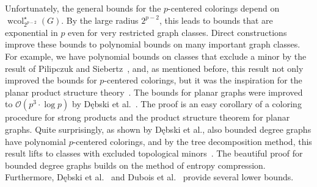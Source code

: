 \documentclass[1p,number,a4paper]{elsarticle}
\theoremstyle{remark}
\newcommand{\Oof}{\mathcal{O}}
\DeclareMathOperator{\wcol}{wcol}
\begin{document}
Unfortunately, the general bounds for the $p$-centered colorings depend on $\wcol_{2^{p-2}}^\star(G)$. 
By the large radius $2^{p-2}$, this leads to bounds that are exponential in $p$ even for very restricted graph classes. 
Direct constructions improve these bounds to polynomial bounds on many important graph classes. 
For example, we have polynomial bounds on classes that exclude a minor by the result of Pilipczuk and Siebertz~\cite{pilipczuk2019polynomial}, and, as mentioned before, this result not only improved the bounds for $p$-centered colorings, but it was the inspiration for the planar product structure theory~\cite{dujmovic2020planar}. 
The bounds for planar graphs were improved to $\Oof(p^3\cdot \log p)$ by Dębski et al.~\cite{debski2020improved}. The proof is an easy corollary of a coloring procedure for strong products and the product structure theorem for planar graphs. 
Quite surprisingly, as shown by Dębski et al., also bounded degree graphs have polynomial $p$-centered colorings, and by the tree decomposition method, this result lifts to classes with excluded topological minors~\cite{debski2020improved}. 
The beautiful proof for bounded degree graphs builds on the method of entropy compression. Furthermore, Dębski et al.~\cite{debski2020improved} and Dubois et al.~\cite{dubois2020two} provide several lower bounds. 
\end{document}
